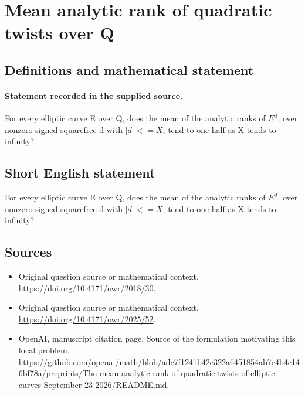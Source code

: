 \documentclass[11pt]{article}
\begin{document}
\section*{Mean analytic rank of quadratic twists over Q}\label{statement}
\subsection{Definitions and mathematical statement}
\paragraph{Statement recorded in the supplied source.}
For every elliptic curve E over Q, does the mean of the analytic ranks of $E^{d}$, over nonzero signed squarefree d with $|d|<=X$, tend to one half as X tends to infinity?
\subsection{Short English statement}
For every elliptic curve E over Q, does the mean of the analytic ranks of $E^{d}$, over nonzero signed squarefree d with $|d|<=X$, tend to one half as X tends to infinity?
\subsection{Sources}
\begin{itemize}
\item[S1] Original question source or mathematical context.
\url{https://doi.org/10.4171/owr/2018/30}.
\item[S2] Original question source or mathematical context.
\url{https://doi.org/10.4171/owr/2025/52}.
\item[S3] OpenAI, manuscript citation page. Source of the formulation motivating this local problem.
\url{https://github.com/openai/math/blob/adc7f1241b42e322a6451854ab7e4b4c146bf78a/preprints/The-mean-analytic-rank-of-quadratic-twists-of-elliptic-curves-September-23-2026/README.md}.
\end{itemize}
\end{document}
